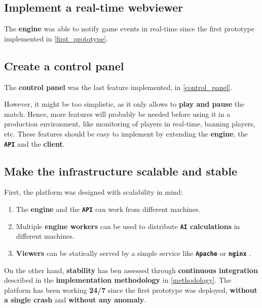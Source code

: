 \documentclass[a4paper,11pt,titlepage,abstract,numbers=noenddot,automark,mnsy,intlimits,rgb,dvipsnames]{report}
\begin{document}
\subsection{Implement a real-time webviewer}
The \textbf{engine} was able to notify game events in real-time since the first prototype implemented in
\autoref{first_prototype}.
\subsection{Create a control panel}
The \textbf{control panel} was the last feature implemented, in \autoref{control_panel}.

However, it might be too simplistic, as it only allows to \textbf{play and pause} the match.
Hence, more features will probably be needed before using it in a production environment, like
monitoring of players in real-time, banning players, etc. These features should be easy to implement by
extending the \textbf{engine}, the \textbf{\texttt{API}} and the \textbf{client}.
\subsection{Make the infrastructure scalable and stable}
First, the platform was designed with scalability in mind:
\begin{enumerate}
\item
The \textbf{engine} and the \textbf{\texttt{API}} can work from different machines.
\item
Multiple \textbf{engine workers} can be used to distribute \textbf{\texttt{AI} calculations} in different machines.
\item
\textbf{Viewers} can be statically served by a simple service like \textbf{\texttt{Apache}} \cite{apache} or \textbf{\texttt{nginx}} \cite{nginx}.
\end{enumerate}

On the other hand, \textbf{stability} has ben assessed through \textbf{continuous integration} described in the \textbf{implementation
methodology} in \autoref{methodology}. The platform has been working \textbf{24/7} since the first prototype was deployed, \textbf{without
a single crash} and \textbf{without any anomaly}.
\end{document}

